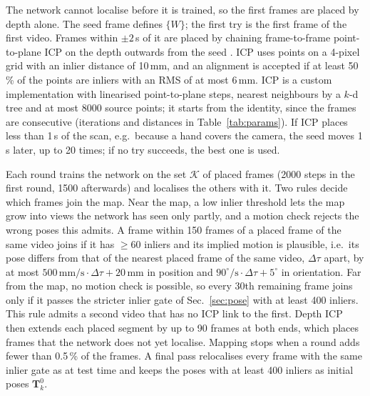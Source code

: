 \documentclass[9pt,shortpaper,twoside,web]{ieeecolor2}
\begin{document}
The network cannot localise before it is trained, so the first frames are placed by depth alone. The seed frame defines $\{W\}$; the first try is the first frame of the first video. Frames within $\pm2$\,s of it are placed by chaining frame-to-frame point-to-plane ICP on the depth outwards from the seed \cite{chen1992icp,low2004linear}. ICP uses points on a 4-pixel grid with an inlier distance of 10\,mm, and an alignment is accepted if at least 50\,\% of the points are inliers with an RMS of at most 6\,mm. ICP is a custom implementation with linearised point-to-plane steps, nearest neighbours by a $k$-d tree and at most 8000 source points; it starts from the identity, since the frames are consecutive (iterations and distances in Table~\ref{tab:params}). If ICP places less than 1\,s of the scan, e.g.\ because a hand covers the camera, the seed moves 1\,s later, up to 20 times; if no try succeeds, the best one is used.

Each round trains the network on the set $\mathcal{K}$ of placed frames (2000 steps in the first round, 1500 afterwards) and localises the others with it. Two rules decide which frames join the map. Near the map, a low inlier threshold lets the map grow into views the network has seen only partly, and a motion check rejects the wrong poses this admits. A frame within 150 frames of a placed frame of the same video joins if it has $\ge60$ inliers and its implied motion is plausible, i.e.\ its pose differs from that of the nearest placed frame of the same video, $\Delta\tau$ apart, by at most $500\,\mathrm{mm/s}\cdot\Delta\tau+20$\,mm in position and $90^\circ/\mathrm{s}\cdot\Delta\tau+5^\circ$ in orientation. Far from the map, no motion check is possible, so every 30th remaining frame joins only if it passes the stricter inlier gate of Sec.~\ref{sec:pose} with at least 400 inliers. This rule admits a second video that has no ICP link to the first. Depth ICP then extends each placed segment by up to 90 frames at both ends, which places frames that the network does not yet localise. Mapping stops when a round adds fewer than 0.5\,\% of the frames. A final pass relocalises every frame with the same inlier gate as at test time and keeps the poses with at least 400 inliers as initial poses $\mathbf{T}^0_k$.
\end{document}
